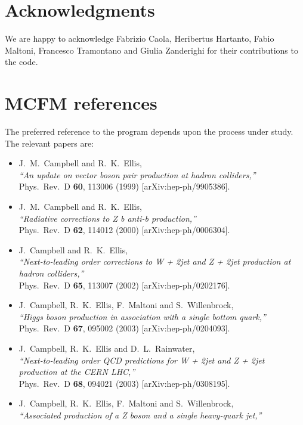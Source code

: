 \documentclass[12pt]{article}
\begin{document}
\section*{Acknowledgments}
We are happy to acknowledge Fabrizio Caola, Heribertus Hartanto, Fabio Maltoni, Francesco Tramontano
and Giulia Zanderighi for their contributions to the code.


\appendix
\section{MCFM references}
\label{MCFMrefs}

The preferred reference to the program depends upon the process under study. The relevant papers are:
\begin{itemize}
\item J.~M.~Campbell and R.~K.~Ellis, \\
  {\it ``An update on vector boson pair production at hadron colliders,''} \\
  Phys.\ Rev.\ D {\bf 60}, 113006 (1999)
  [arXiv:hep-ph/9905386].
\item J.~M.~Campbell and R.~K.~Ellis, \\
  {\it ``Radiative corrections to Z b anti-b production,''} \\
  Phys.\ Rev.\ D {\bf 62}, 114012 (2000)
  [arXiv:hep-ph/0006304].
\item J.~Campbell and R.~K.~Ellis, \\
  {\it ``Next-to-leading order corrections to W + 2jet and Z + 2jet production  at
   hadron colliders,''} \\
  Phys.\ Rev.\ D {\bf 65}, 113007 (2002)
  [arXiv:hep-ph/0202176].
\item J.~Campbell, R.~K.~Ellis, F.~Maltoni and S.~Willenbrock, \\
  {\it ``Higgs boson production in association with a single bottom quark,''} \\
  Phys.\ Rev.\ D {\bf 67}, 095002 (2003)
  [arXiv:hep-ph/0204093].
\item J.~Campbell, R.~K.~Ellis and D.~L.~Rainwater, \\
  {\it ``Next-to-leading order QCD predictions for W + 2jet and Z + 2jet  production
     at the CERN LHC,''} \\
  Phys.\ Rev.\ D {\bf 68}, 094021 (2003)
  [arXiv:hep-ph/0308195].
\item J.~Campbell, R.~K.~Ellis, F.~Maltoni and S.~Willenbrock, \\
  {\it ``Associated production of a Z boson and a single heavy-quark jet,''} \\

\end{itemize}
\end{document}
